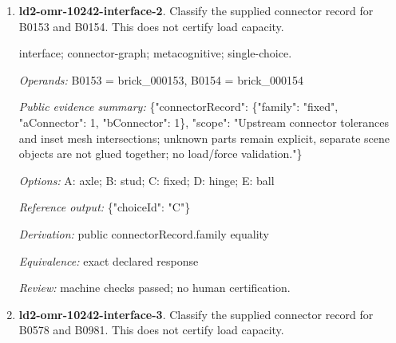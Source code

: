 \begin{enumerate}
\par{\small interface; connector-graph; metacognitive; single-choice.\par\textit{Operands:} B0032 = brick\_000032, B0028 = brick\_000028\par\textit{Public evidence summary:} \{"connectorRecord": \{"family": "axle", "aConnector": 12, "bConnector": 0\}, "scope": "Upstream connector tolerances and inset mesh intersections; unknown parts remain explicit, separate scene objects are not glued together; no load/force validation."\}\par\textit{Options:} A: hinge; B: axle; C: ball; D: stud; E: fixed\par\textit{Reference output:} \{"choiceId": "B"\}\par\textit{Derivation:} public connectorRecord.family equality\par\textit{Equivalence:} exact declared response\par\textit{Review:} machine checks passed; no human certification.}
\item \textbf{ld2-omr-10242-interface-2}. Classify the supplied connector record for B0153 and B0154. This does not certify load capacity.
\par{\small interface; connector-graph; metacognitive; single-choice.\par\textit{Operands:} B0153 = brick\_000153, B0154 = brick\_000154\par\textit{Public evidence summary:} \{"connectorRecord": \{"family": "fixed", "aConnector": 1, "bConnector": 1\}, "scope": "Upstream connector tolerances and inset mesh intersections; unknown parts remain explicit, separate scene objects are not glued together; no load/force validation."\}\par\textit{Options:} A: axle; B: stud; C: fixed; D: hinge; E: ball\par\textit{Reference output:} \{"choiceId": "C"\}\par\textit{Derivation:} public connectorRecord.family equality\par\textit{Equivalence:} exact declared response\par\textit{Review:} machine checks passed; no human certification.}
\item \textbf{ld2-omr-10242-interface-3}. Classify the supplied connector record for B0578 and B0981. This does not certify load capacity.

\end{enumerate}
